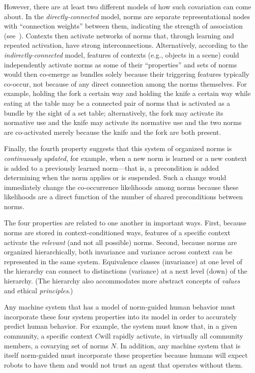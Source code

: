 \documentclass[12pt]{article}
\begin{document}
However, there are at least two different models of how such
covariation can come about.  In the {\em directly-connected} model,
norms are separate representational nodes with ``connection weights''
between them, indicating the strength of association (see~\cite{harvey81}).  Contexts then
activate networks of norms that, through learning and repeated
activation, have strong interconnections.  Alternatively, according to
the {\em indirectly-connected} model, features of contexts (e.g.,
objects in a scene) could independently activate norms as some of
their ``properties'' and sets of norms would then co-emerge as bundles
solely because their triggering features typically co-occur, not
because of any direct connection among the norms themselves.  For
example, holding the fork a certain way and holding the knife a
certain way while eating at the table may be a connected pair of norms
that is activated as a bundle by the sight of a set table;
alternatively, the fork may activate its normative use and the knife
may activate its normative use and the two norms are co-activated
merely because the knife and the fork are both present.

Finally, the fourth property suggests that this system of organized
norms is {\em continuously updated}, for example, when a new norm is
learned or a new context is added to a previously learned norm---that is,
a precondition is added determining when the norm applies or is
suspended.  Such a change would immediately change the co-occurrence
likelihoods among norms because these likelihoods are a direct function of the number of shared preconditions between norms.

The four properties are related to one another in important
ways. First, because norms are stored in context-conditioned ways,
features of a specific context activate the {\em relevant} (and not
all possible) norms. Second, because norms are organized
hierarchically, both invariance and variance across context can be
represented in the same system.  Equivalence classes (invariance) at
one level of the hierarchy can connect to distinctions (variance) at a
next level (down) of the hierarchy. (The hierarchy also accommodates
more abstract concepts of {\em values} and ethical {\em principles}.)

Any machine system that has a model of norm-guided human behavior must incorporate these four system properties into its model in order to accurately predict human behavior. For example, the system must know that, in a given community, a specific context $C$will rapidly activate, in virtually all community members, a covarying set of norms $N$.  In addition, any machine system
that is itself norm-guided must incorporate these properties because humans
will expect robots to have them and would not trust an agent that operates without them.
\end{document}
